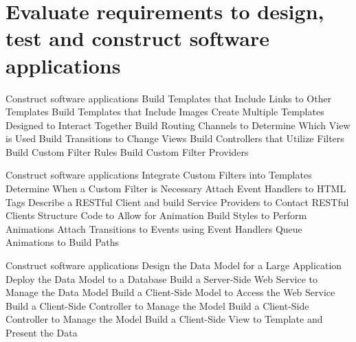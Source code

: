 \section {Evaluate requirements to design, test and construct software applications }
\begin{frame}{Construct software applications}
	Build Templates that Include Links to Other Templates
	Build Templates that Include Images
	Create Multiple Templates Designed to Interact Together
	Build Routing Channels to Determine Which View is Used
	Build Transitions to Change Views
	Build Controllers that Utilize Filters
	Build Custom Filter Rules
	Build Custom Filter Providers
\end{frame}		
\begin{frame}{Construct software applications}
	Integrate Custom Filters into Templates
	Determine When a Custom Filter is Necessary
	Attach Event Handlers to HTML Tags
	Describe a RESTful Client and build Service Providers to Contact RESTful Clients
	Structure Code to Allow for Animation
	Build Styles to Perform Animations
	Attach Transitions to Events using Event Handlers
	Queue Animations to Build Paths
\end{frame}		
\begin{frame}{Construct software applications}
	Design the Data Model for a Large Application
	Deploy the Data Model to a Database
	Build a Server-Side Web Service to Manage the Data Model
	Build a Client-Side Model to Access the Web Service
	Build a Client-Side Controller to Manage the Model
	Build a Client-Side Controller to Manage the Model
	Build a Client-Side View to Template and Present the Data      
\end{frame}		

